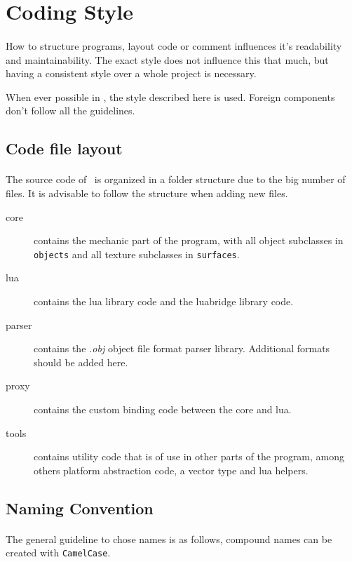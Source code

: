 \section{Coding Style}
\paragraph{}
How to structure programs, layout code or comment influences it's readability and maintainability.
The exact style does not influence this that much, but having a consistent style over a whole project is necessary.

When ever possible in \ER, the style described here is used.
Foreign components don't follow all the guidelines.

\subsection{Code file layout}
\paragraph{}
The source code of \ER\ is organized in a folder structure due to the big number of files.
It is advisable to follow the structure when adding new files.

\begin{description}
\item[{core}] contains the mechanic part of the program, with all object subclasses in \texttt{objects} and all texture subclasses in \texttt{surfaces}.
\item[{lua}] contains the lua library code and the luabridge library code.
\item[{parser}] contains the \textit{.obj} object file format parser library.
Additional formats should be added here.
\item[{proxy}] contains the custom binding code between the core and lua.
\item[{tools}] contains utility code that is of use in other parts of the program, among others platform abstraction code, a vector type and lua helpers.
\end{description}

\subsection{Naming Convention}
\paragraph{}
The general guideline to chose names is as follows, compound names can be created with \texttt{CamelCase}.

